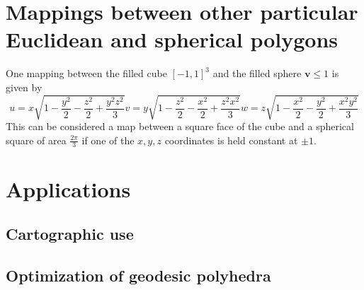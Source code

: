 \documentclass{amsart}[12pt]
\begin{document}
\section{Mappings between other particular Euclidean and spherical polygons}

One mapping between the filled cube $[-1,1]^3$ and the filled sphere
$\mathbf{v} \le 1$ is given by
\cite{nowell}
\begin{equation}
u = x \sqrt{1 - \frac{y^2}{2}-\frac{z^2}{2}+\frac{y^2 z^2}{3}}
v = y \sqrt{1 - \frac{z^2}{2}-\frac{x^2}{2}+\frac{z^2 x^2}{3}}
w = z \sqrt{1 - \frac{x^2}{2}-\frac{y^2}{2}+\frac{x^2 y^2}{3}}
\end{equation}
This can be considered a map between a square face of the cube and a spherical
square of area $\frac{2 \pi}{3}$ if one of the $x,y,z$ coordinates is held
constant at $\pm 1$.

\section{Applications}
\subsection{Cartographic use}

\subsection{Optimization of geodesic polyhedra}



\end{document}
